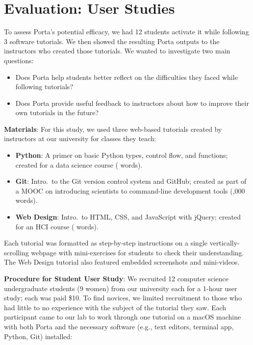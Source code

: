 \section{Evaluation: User Studies}

To assess Porta's potential efficacy, we had 12 students activate it
while following 3 software tutorials. We then showed the resulting Porta
outputs to the instructors who created those tutorials. We wanted to
investigate two main questions:

\begin{itemize}\itemsep0pt

\item Does Porta help students better reflect on the difficulties they
faced while following tutorials?

\item Does Porta provide useful feedback to instructors about how to
improve their own tutorials in the future?

\end{itemize}


\textbf{Materials}: For this study, we used three web-based
tutorials created by instructors at our university for classes they
teach:

\begin{itemize}\itemsep0pt

\item \textbf{Python}: A primer on basic Python types, control flow, and
functions; created for a data science course ( words).

\item \textbf{Git}: Intro.\ to the Git version control system and
GitHub; created as part of a MOOC on introducing scientists
to command-line development tools (,000 words).

\item \textbf{Web Design}: Intro.\ to HTML, CSS, and JavaScript with
jQuery; created for an HCI course ( words).

\end{itemize}

Each tutorial was formatted as step-by-step instructions on a single
vertically-scrolling webpage with mini-exercises for students to check
their understanding. The Web Design tutorial also featured embedded
screenshots and mini-videos.

\textbf{Procedure for Student User Study}: We recruited 12
computer science undergraduate students (9 women) from our university
each for a 1-hour user study; each was paid \$10. To find novices, we
limited recruitment to those who had little to no experience with the
subject of the tutorial they saw.
%
%
Each participant came to our lab to work through one tutorial on a macOS
machine with both Porta and the necessary software (e.g., text editors,
terminal app, Python, Git) installed:

